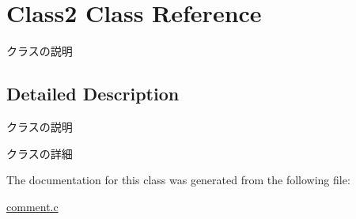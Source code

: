 \hypertarget{classClass2}{\section{Class2 Class Reference}
\label{classClass2}
}


クラスの説明  




\subsection{Detailed Description}
クラスの説明 

クラスの詳細 

The documentation for this class was generated from the following file\+:\begin{DoxyCompactItemize}
\item 
\hyperlink{comment_8c}{comment.\+c}\end{DoxyCompactItemize}
